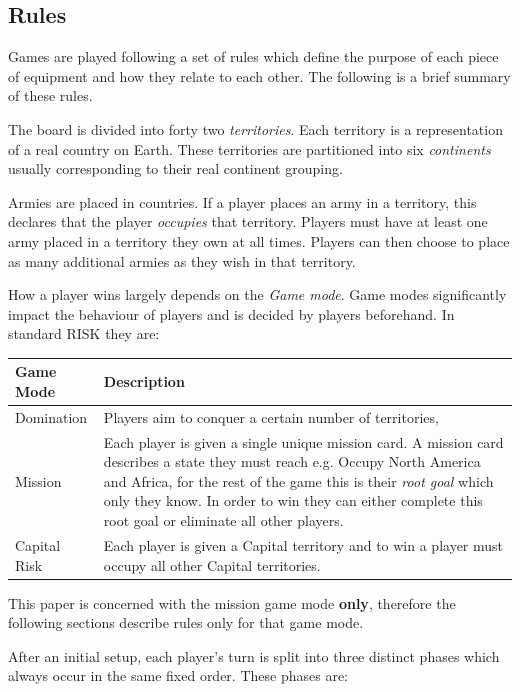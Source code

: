 \documentclass[parskip]{cs4rep}
\begin{document}
\subsection{Rules}

Games are played following a set of rules which define the purpose of each piece of equipment and how they relate to each other. The following is a brief summary of these rules.

The board is divided into forty two \textit{territories}. Each territory is a representation of a real country on Earth. These territories are partitioned into six \textit{continents} usually corresponding to their real continent grouping.

Armies are placed in countries. If a player places an army in a territory, this declares that the player \textit{occupies} that territory. Players must have at least one army placed in a territory they own at all times. Players can then choose to place as many additional armies as they wish in that territory.

How a player wins largely depends on the \textit{Game mode}. Game modes significantly impact the behaviour of players and is decided by players beforehand. In standard RISK they are:
\newline

\begin{tabular}{|l|p{11cm}|}
\hline 
\textbf{Game Mode} & \textbf{Description} \\ 
\hline 
Domination & Players aim to conquer a certain number of territories, \\ 
\hline 
Mission & Each player is given a single unique mission card. A mission card describes a state they must reach e.g. Occupy North America and Africa, for the rest of the game this is their \textit{root goal} which only they know. In order to win they can either complete this root goal or eliminate all other players. \\ 
\hline 
Capital Risk & Each player is given a Capital territory and to win a player must occupy all other Capital territories. \\ 
\hline
\end{tabular} 
\newline

This paper is concerned with the mission game mode \textbf{only}, therefore the following sections describe rules only for that game mode.

After an initial setup, each player's turn is split into three distinct phases which always occur in the same fixed order. These phases are:
\end{document}
